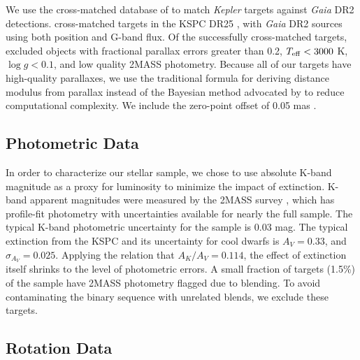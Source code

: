 \documentclass[manuscript]{aastex6}
\newcommand{\Kepler}{\mbox{\textit{Kepler}}}
\newcommand{\Gaia}{\mbox{\textit{Gaia}}}
\newcommand{\Teff}{\ensuremath{T_{\rm eff}}}
\newcommand{\logg}{\ensuremath{\log g}}
\newcommand{\gvs}{\authorcomment1}
\begin{document}

We use the cross-matched database of \citet{Berger18b} to match \Kepler{} targets
against \Gaia{} DR2 detections.
\citet{Berger18b} cross-matched targets in the KSPC DR25 \citep{Mathur17}, 
with \Gaia{} DR2 sources using both position and G-band flux. Of the 
successfully cross-matched targets, \citet{Berger18b} excluded objects with 
fractional parallax errors greater than 0.2, \(\Teff < 3000\) K, 
\(\logg < 0.1\), and low quality 2MASS photometry.  Because all of our 
targets have high-quality parallaxes, we use the traditional 
formula for deriving distance modulus from parallax instead of the Bayesian 
method advocated by \citet{Luri18} to reduce computational complexity. We
include the zero-point offset of 0.05 mas \citep{Zinn18}.

\subsection{Photometric Data}

In order to characterize our stellar sample, we chose to use absolute K-band
magnitude as a proxy for luminosity to minimize the impact of extinction. 
K-band apparent magnitudes were measured by the 2MASS survey 
\citep{Skrutskie06}, which has profile-fit photometry with uncertainties 
available for nearly the full sample.  The 
typical K-band photometric uncertainty for the \citet{McQuillan14} sample is 
0.03 mag. The typical extinction from the KSPC and its uncertainty for cool 
dwarfs is \(A_V = 0.33\), and \(\sigma_{A_V}=0.025\). Applying the 
\citet{Cardelli89} relation that \(A_K/A_V = 0.114\), the effect of extinction 
itself shrinks to the level of photometric errors.  A small fraction of 
targets (1.5\%) of the \citet{McQuillan14} sample have 2MASS photometry 
flagged due to blending. To avoid contaminating the binary sequence with 
unrelated blends, we exclude these targets.

\subsection{Rotation Data}
\end{document}
